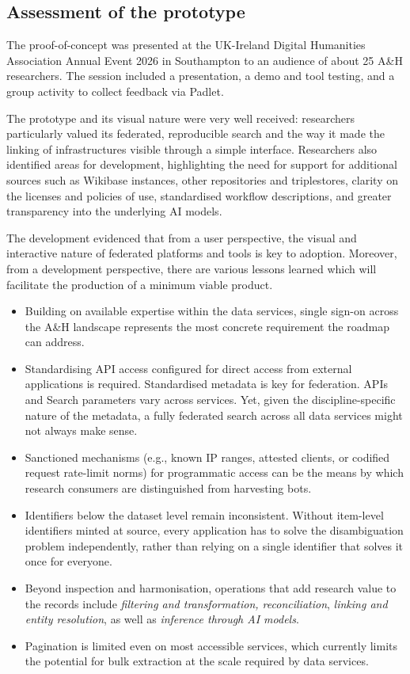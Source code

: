 \documentclass[11pt]{scrartcl}
\begin{document}
\subsection{Assessment of the prototype}
The proof-of-concept was presented at the UK-Ireland Digital Humanities Association Annual Event 2026 in Southampton to an audience of about 25 A\&H researchers. The session included a presentation, a demo and tool testing, and a group activity to collect feedback via Padlet. 

The prototype and its visual nature were very well received: researchers particularly valued its federated, reproducible search and the way it made the linking of infrastructures visible through a simple interface. Researchers also identified areas for development, highlighting the need for support for additional sources such as Wikibase instances, other repositories and triplestores, clarity on the licenses and policies of use, standardised workflow descriptions, and greater transparency into the underlying AI models.

The development evidenced that from a user perspective, the visual and interactive nature of federated platforms and tools is key to adoption. Moreover, from a development perspective, there are various lessons learned which will facilitate the production of a minimum viable product.
\begin{itemize}
\item Building on available expertise within the data services, single sign-on across the A\&H landscape represents the most concrete requirement the roadmap can address. 
\item Standardising API access configured for direct access from external applications is required. Standardised metadata is key for federation. APIs and Search parameters vary across services. Yet, given the discipline-specific nature of the metadata, a fully federated search across all data services might not always make sense.
\item Sanctioned mechanisms (e.g., known IP ranges, attested clients, or codified request rate-limit norms) for programmatic access can be the means by which research consumers are distinguished from harvesting bots.
\item Identifiers below the dataset level remain inconsistent. Without item-level identifiers minted at source, every application has to solve the disambiguation problem independently, rather than relying on a single identifier that solves it once for everyone.
\item Beyond inspection and harmonisation, operations that add research value to the records include \emph{filtering and transformation, reconciliation}, \emph{linking and entity resolution}, as well as \emph{inference through AI models}.
\item Pagination is limited even on most accessible services, which currently limits the potential for bulk extraction at the scale required by data services. 
\end{itemize}
\end{document}
